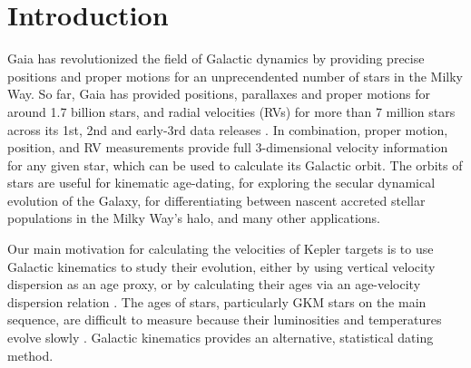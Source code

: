 \section{Introduction}

Gaia has revolutionized the field of Galactic dynamics by providing precise
positions and proper motions for an unprecendented number of stars in the
Milky Way.
So far, Gaia has provided positions, parallaxes and proper motions for around
1.7 billion stars, and radial velocities (RVs) for more than 7 million stars
across its 1st, 2nd and early-3rd data releases \citep{gaia, gaia_dr2,
gaia_edr3}.
In combination, proper motion, position, and RV measurements provide full
3-dimensional velocity information for any given star, which can be used to
calculate its Galactic orbit.
The orbits of stars are useful for kinematic age-dating, for exploring the
secular dynamical evolution of the Galaxy, for differentiating between nascent
accreted stellar populations in the Milky Way's halo, and many other
applications.

Our main motivation for calculating the velocities of Kepler targets is to use
Galactic kinematics to study their evolution, either by using vertical
velocity dispersion as an age proxy, or by calculating their ages via an
age-velocity dispersion relation \citep[\eg][]{angus2020, lu2021}.
The ages of stars, particularly GKM stars on the main sequence, are difficult
to measure because their luminosities and temperatures evolve slowly
\citep[see][for a review of stellar ages]{soderblom2010}.
Galactic kinematics provides an alternative, statistical dating method.

